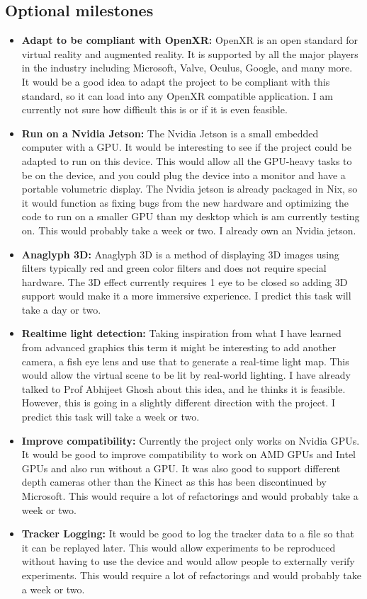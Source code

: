 \subsection{Optional milestones}
\begin{itemize}
    \item \textbf{Adapt to be compliant with OpenXR:} OpenXR is an open standard for virtual reality and augmented reality. It is supported by all the major players in the industry including Microsoft, Valve, Oculus, Google, and many more. It would be a good idea to adapt the project to be compliant with this standard, so it can load into any OpenXR compatible application. I am currently not sure how difficult this is or if it is even feasible.
 
    \item \textbf{Run on a Nvidia Jetson:} The Nvidia Jetson is a small embedded computer with a GPU. It would be interesting to see if the project could be adapted to run on this device. This would allow all the GPU-heavy tasks to be on the device, and you could plug the device into a monitor and have a portable volumetric display. The Nvidia jetson is already packaged in Nix, so it would function as fixing bugs from the new hardware and optimizing the code to run on a smaller GPU than my desktop which is am currently testing on. This would probably take a week or two. I already own an Nvidia jetson.

    \item \textbf{Anaglyph 3D:} Anaglyph 3D is a method of displaying 3D images using filters typically red and green color filters and does not require special hardware. The 3D effect currently requires 1 eye to be closed so adding 3D support would make it a more immersive experience. I predict this task will take a day or two.
    
    \item \textbf{Realtime light detection:} Taking inspiration from what I have learned from advanced graphics this term it might be interesting to add another camera, a fish eye lens and use that to generate a real-time light map. This would allow the virtual scene to be lit by real-world lighting. I have already talked to Prof Abhijeet Ghosh about this idea, and he thinks it is feasible. However, this is going in a slightly different direction with the project. I predict this task will take a week or two.
    
    \item \textbf{Improve compatibility:} Currently the project only works on Nvidia GPUs. It would be good to improve compatibility to work on AMD GPUs and Intel GPUs and also run without a GPU. It was also good to support different depth cameras other than the Kinect as this has been discontinued by Microsoft. This would require a lot of refactorings and would probably take a week or two.
    
    \item \textbf{Tracker Logging:} It would be good to log the tracker data to a file so that it can be replayed later. This would allow experiments to be reproduced without having to use the device and would allow people to externally verify experiments. This would require a lot of refactorings and would probably take a week or two.
\end{itemize}